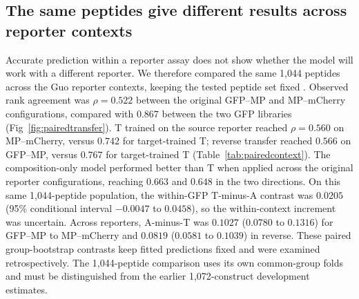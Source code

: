 \documentclass[11pt,a4paper]{article}
\begin{document}
\subsection{The same peptides give different results across reporter contexts}
Accurate prediction within a reporter assay does not show whether the
model will work with a different reporter. We therefore compared the same
1,044 peptides across the Guo reporter contexts, keeping the tested peptide
set fixed \cite{guo}. Observed rank agreement was
$\rho=0.522$ between the original GFP--MP and MP--mCherry configurations,
compared with $0.867$ between the two GFP libraries (Fig~\ref{fig:pairedtransfer}).
T trained on the source reporter reached $\rho=0.560$ on MP--mCherry, versus $0.742$ for
target-trained T; reverse transfer reached $0.566$ on GFP--MP, versus
$0.767$ for target-trained T (Table~\ref{tab:pairedcontext}).
The composition-only model performed better than T when applied across the original reporter configurations, reaching $0.663$ and $0.648$ in the two directions.
On this same 1,044-peptide population, the within-GFP T-minus-A contrast
was $0.0205$ (95\% conditional interval $-0.0047$ to $0.0458$), so the
within-context increment was uncertain. Across reporters, A-minus-T was
$0.1027$ ($0.0780$ to $0.1316$) for GFP--MP to MP--mCherry and $0.0819$
($0.0581$ to $0.1039$) in reverse. These paired group-bootstrap contrasts
keep fitted predictions fixed and were examined retrospectively. The
1,044-peptide comparison uses its own common-group folds and must be
distinguished from the earlier 1,072-construct development estimates.
\end{document}
